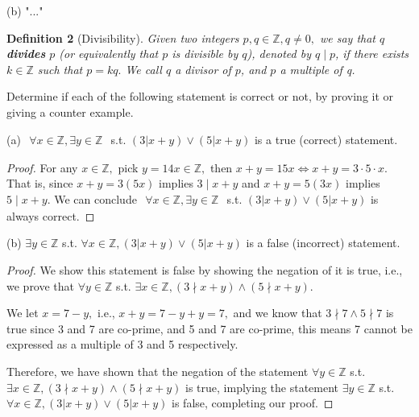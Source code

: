 \documentclass{homework}
\begin{document}
(b) "..."



\newpage
\question \textbf{Definition 2} (Divisibility). \textit{Given two integers $p,q\in\mathbb{Z},q\neq 0,$ we say that $q$ \textbf{divides} $p$ (or equivalently that $p$ is divisible by $q$), denoted by $q\mid p$, if there exists $k\in\mathbb{Z}$ such that $p=kq.$ We call $q$ a divisor of $p$, and $p$ a multiple of q.}

Determine if each of the following statement is correct or not, by proving it or giving a counter example. 

\begin{claim}
    (a) $\begin{aligned}\forall x\in\mathbb{Z},\exists y\in\mathbb{Z}\end{aligned}$ s.t. $(3|x+y)\lor(5|x+y)$ is a true (correct) statement. 
\end{claim}

\begin{proof}
    For any $x\in\mathbb{Z},$ pick $y=14x\in\mathbb{Z},$ then $x+y=15x \iff x+y=3\cdot5\cdot x.$ That is, since $x+y=3(5x)$ implies $3\mid x+y$ and $x+y=5(3x)$ implies $5\mid x+y.$ We can conclude $\begin{aligned}\forall x\in\mathbb{Z},\exists y\in\mathbb{Z}\end{aligned}$ s.t. $(3|x+y)\lor(5|x+y)$ is always correct. 
\end{proof}

\begin{claim}
    (b) $\exists y\in\mathbb{Z}$ s.t. $\forall x \in \mathbb{Z},(3|x+y)\lor(5|x+y)$ is a false (incorrect) statement. 
\end{claim}

\begin{proof}
    We show this statement is false by showing the negation of it is true, i.e., we prove that $\forall y \in\mathbb{Z}$ s.t. $\exists x\in\mathbb{Z}, (3\nmid x+y)\land(5\nmid x+y)$.

    We let $x=7-y,$ i.e., $x+y=7-y+y=7,$ and we know that $3\nmid7\land5\nmid7$ is true since 3 and 7 are co-prime, and 5 and 7 are co-prime, this means 7 cannot be expressed as a multiple of 3 and 5 respectively. 
    
    Therefore, we have shown that the negation of the statement  $\forall y \in\mathbb{Z}$ s.t. $\exists x\in\mathbb{Z}, (3\nmid x+y)\land(5\nmid x+y)$ is true, implying the statement $\exists y\in\mathbb{Z}$ s.t. $\forall x \in \mathbb{Z},(3|x+y)\lor(5|x+y)$ is false, completing our proof.  
\end{proof}
\end{document}
